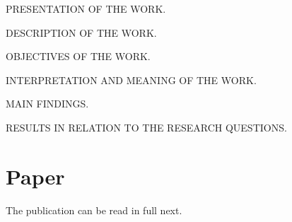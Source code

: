 PRESENTATION OF THE WORK.\@

DESCRIPTION OF THE WORK.\@

OBJECTIVES OF THE WORK.\@

INTERPRETATION AND MEANING OF THE WORK.\@

MAIN FINDINGS.\@

RESULTS IN RELATION TO THE RESEARCH QUESTIONS.\@

\section{Paper}

The publication can be read in full next.



